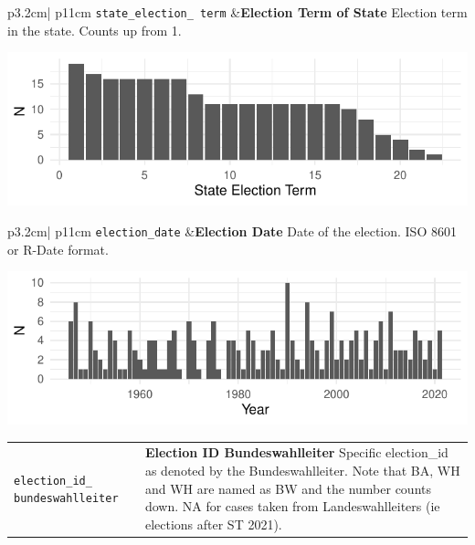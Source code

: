 \documentclass[
]{article}
\begin{document}
\begin{longtable}{p{3.2cm}| p{11cm}}
\texttt{state\_election\_
term} &\textbf{Election Term of State}\newline 
Election term in the state. Counts up from 1.



\hspace*{.25cm}
\begin{minipage}[t]{\linewidth }
\vspace{0pt}
\includegraphics[width = \linewidth]{cbelec/electiontermplot.pdf}
\end{minipage}





\end{longtable}

\begin{longtable}{p{3.2cm}| p{11cm}}
\texttt{election\_date} &\textbf{Election Date}\newline 
Date of the election.  ISO 8601 or R-Date format.

\hspace*{.25cm}
\begin{minipage}[t]{\linewidth }
\vspace{0pt}
\includegraphics[width = \linewidth]{cbelec/electiondatesplot.pdf}
\end{minipage}


\end{longtable}

\begin{longtable}{p{3.2cm}| p{11cm}}
\texttt{election\_id\_
bundeswahlleiter} &\textbf{Election ID Bundeswahlleiter}\newline 
Specific election\_id as denoted by the Bundeswahlleiter. Note that BA, WH and WH are named as BW and the number counts down. NA for cases taken from Landeswahlleiters (ie elections after ST 2021).
\end{longtable}
\end{document}

